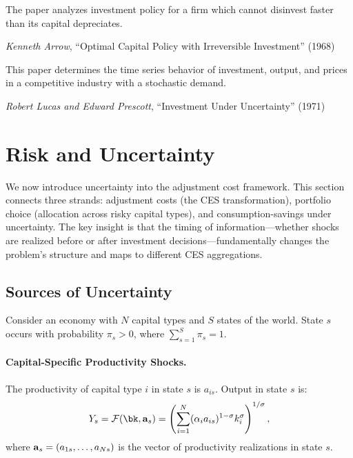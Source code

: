 \epigraph{The paper analyzes investment policy for a firm which cannot disinvest faster than its capital depreciates.}{\textit{Kenneth Arrow}, ``Optimal Capital Policy with Irreversible Investment'' (1968)}

\epigraph{This paper determines the time series behavior of investment, output, and prices in a competitive industry with a stochastic demand.}{\textit{Robert Lucas and Edward Prescott}, ``Investment Under Uncertainty'' (1971)}



\section{Risk and Uncertainty}
\label{sec:ac-risk}

We now introduce uncertainty into the adjustment cost framework. This section connects three strands: adjustment costs (the CES transformation), portfolio choice (allocation across risky capital types), and consumption-savings under uncertainty. The key insight is that the timing of information---whether shocks are realized before or after investment decisions---fundamentally changes the problem's structure and maps to different CES aggregations.

\subsection{Sources of Uncertainty}
\label{subsec:ac-risk-sources}

Consider an economy with $N$ capital types and $S$ states of the world. State $s$ occurs with probability $\pi_s > 0$, where $\sum_{s=1}^{S} \pi_s = 1$.

\paragraph{Capital-Specific Productivity Shocks.}
The productivity of capital type $i$ in state $s$ is $a_{is}$. Output in state $s$ is:
\begin{equation}
Y_s = \F(\bk, \ba_s) = \left( \sum_{i=1}^{N} (\alpha_i a_{is})^{1-\sigma} k_i^{\sigma} \right)^{1/\sigma},
\label{eq:ac-risk-production}
\end{equation}
where $\mathbf{a}_s = (a_{1s}, \ldots, a_{Ns})$ is the vector of productivity realizations in state $s$.

